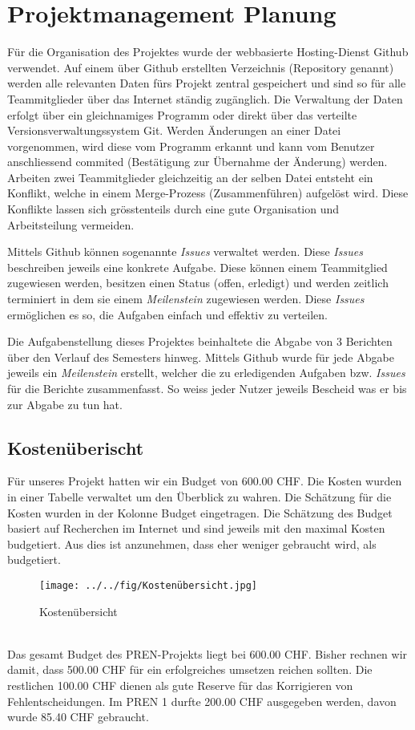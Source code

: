 \section{Projektmanagement Planung}
Für die Organisation des Projektes wurde der webbasierte Hosting-Dienst Github verwendet. Auf einem über Github erstellten Verzeichnis (Repository genannt) werden alle relevanten Daten fürs Projekt zentral gespeichert und sind so für alle Teammitglieder über das Internet ständig zugänglich. Die Verwaltung der Daten erfolgt über ein gleichnamiges Programm oder direkt über das verteilte Versionsverwaltungssystem Git. Werden Änderungen an einer Datei vorgenommen, wird diese vom Programm erkannt und kann vom Benutzer anschliessend commited (Bestätigung zur Übernahme der Änderung) werden. Arbeiten zwei Teammitglieder gleichzeitig an der selben Datei entsteht ein Konflikt, welche in einem Merge-Prozess (Zusammenführen) aufgelöst wird. Diese Konflikte lassen sich grösstenteils durch eine gute Organisation und Arbeitsteilung vermeiden.

Mittels Github können sogenannte \emph{Issues} verwaltet werden. Diese \emph{Issues} beschreiben jeweils eine konkrete Aufgabe. Diese können einem Teammitglied zugewiesen werden, besitzen einen Status (offen, erledigt) und werden zeitlich terminiert in dem sie einem \emph{Meilenstein} zugewiesen werden. Diese \emph{Issues} ermöglichen es so, die Aufgaben einfach und effektiv zu verteilen.

Die Aufgabenstellung dieses Projektes beinhaltete die Abgabe von 3 Berichten über den Verlauf des Semesters hinweg. Mittels Github wurde für jede Abgabe jeweils ein \emph{Meilenstein} erstellt, welcher die zu erledigenden Aufgaben bzw. \emph{Issues} für die Berichte zusammenfasst. So weiss jeder Nutzer jeweils Bescheid was er bis zur Abgabe zu tun hat.

\subsection{Kostenüberischt}
Für unseres Projekt hatten wir ein Budget von 600.00 CHF. Die Kosten wurden in einer Tabelle verwaltet um den Überblick zu wahren. Die Schätzung für die Kosten wurden in der Kolonne Budget eingetragen. Die Schätzung des Budget basiert auf Recherchen im Internet und sind jeweils mit den maximal Kosten budgetiert. Aus dies ist anzunehmen, dass eher weniger gebraucht wird, als budgetiert. \\
\begin{figure}[h!]
	\center
	\texttt{[image: ../../fig/Kostenübersicht.jpg]}
	\caption{Kostenübersicht}
	\label{fig:Kostenübersicht}
\end{figure}\\
	Das gesamt Budget des PREN-Projekts liegt bei 600.00 CHF. Bisher rechnen wir damit, dass 500.00 CHF für ein erfolgreiches umsetzen reichen sollten. Die restlichen 100.00 CHF dienen als gute Reserve für das Korrigieren von Fehlentscheidungen. Im PREN 1 durfte 200.00 CHF ausgegeben werden, davon wurde 85.40 CHF gebraucht. 







